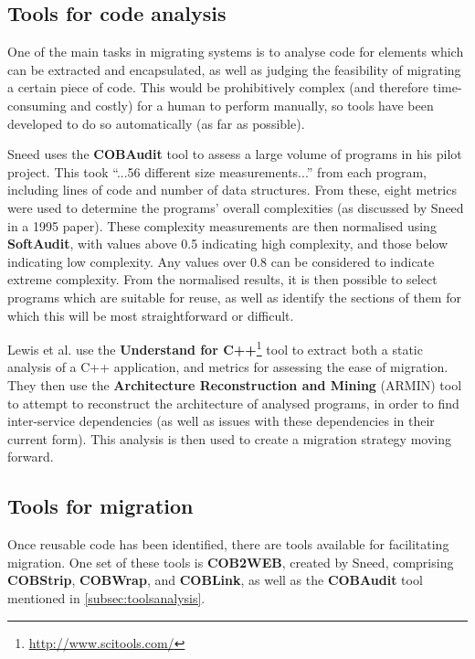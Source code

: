 \documentclass[12pt,journal,compsoc]{IEEEtran}
\begin{document}
\subsection{Tools for code analysis}
\label{subsec:toolsanalysis}
One of the main tasks in migrating systems is to analyse code for elements which can be extracted and encapsulated, as well as judging the feasibility of migrating a certain piece of code. This would be prohibitively complex (and therefore time-consuming and costly) for a human to perform manually, so tools have been developed to do so automatically (as far as possible).

Sneed\cite{Sneed2009} uses the \textbf{COBAudit} tool to assess a large volume of programs in his pilot project. This took ``...56 different size measurements...''\cite{Sneed2009} from each program, including lines of code and number of data structures. From these, eight metrics were used to determine the programs' overall complexities (as discussed by Sneed in a 1995 paper\cite{Sneed1995}). These complexity measurements are then normalised using \textbf{SoftAudit}, with values above 0.5 indicating high complexity, and those below indicating low complexity. Any values over 0.8 can be considered to indicate extreme complexity. From the normalised results, it is then possible to select programs which are suitable for reuse, as well as identify the sections of them for which this will be most straightforward or difficult.

Lewis et al.\cite{Lewis2005a} use the \textbf{Understand for C++}\footnote{\url{http://www.scitools.com/}} tool to extract both a static analysis of a C++ application, and metrics for assessing the ease of migration. They then use the \textbf{Architecture Reconstruction and Mining} (ARMIN)\cite{O'Brien2005} tool to attempt to reconstruct the architecture of analysed programs, in order to find inter-service dependencies (as well as issues with these dependencies in their current form). This analysis is then used to create a migration strategy moving forward.

\subsection{Tools for migration}
\label{subsec:toolsmigration}
Once reusable code has been identified, there are tools available for facilitating migration. One set of these tools is \textbf{COB2WEB}, created by Sneed\cite{Sneed2008}, comprising \textbf{COBStrip}, \textbf{COBWrap}, and \textbf{COBLink}, as well as the \textbf{COBAudit} tool mentioned in \autoref{subsec:toolsanalysis}.
\end{document}
